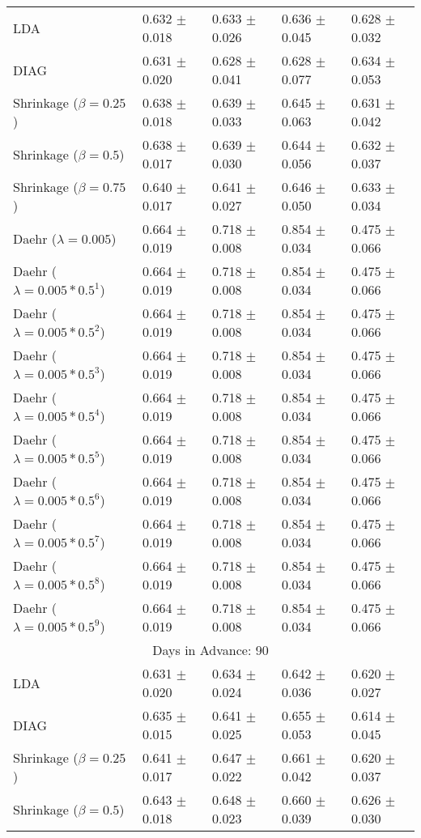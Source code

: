 \begin{table}
\begin{tabular}{*{5}{l}}
LDA&0.632 $\pm$ 0.018&0.633 $\pm$ 0.026&0.636 $\pm$ 0.045&0.628 $\pm$ 0.032\\
DIAG&0.631 $\pm$ 0.020&0.628 $\pm$ 0.041&0.628 $\pm$ 0.077&0.634 $\pm$ 0.053\\
Shrinkage ($\beta=0.25$)&0.638 $\pm$ 0.018&0.639 $\pm$ 0.033&0.645 $\pm$ 0.063&0.631 $\pm$ 0.042\\
Shrinkage ($\beta=0.5$)&0.638 $\pm$ 0.017&0.639 $\pm$ 0.030&0.644 $\pm$ 0.056&0.632 $\pm$ 0.037\\
Shrinkage ($\beta=0.75$)&0.640 $\pm$ 0.017&0.641 $\pm$ 0.027&0.646 $\pm$ 0.050&0.633 $\pm$ 0.034\\
Daehr ($\lambda=0.005$)&0.664 $\pm$ 0.019&0.718 $\pm$ 0.008&0.854 $\pm$ 0.034&0.475 $\pm$ 0.066\\
Daehr ($\lambda=0.005*0.5^1$)&0.664 $\pm$ 0.019&0.718 $\pm$ 0.008&0.854 $\pm$ 0.034&0.475 $\pm$ 0.066\\
Daehr ($\lambda=0.005*0.5^2$)&0.664 $\pm$ 0.019&0.718 $\pm$ 0.008&0.854 $\pm$ 0.034&0.475 $\pm$ 0.066\\
Daehr ($\lambda=0.005*0.5^3$)&0.664 $\pm$ 0.019&0.718 $\pm$ 0.008&0.854 $\pm$ 0.034&0.475 $\pm$ 0.066\\
Daehr ($\lambda=0.005*0.5^4$)&0.664 $\pm$ 0.019&0.718 $\pm$ 0.008&0.854 $\pm$ 0.034&0.475 $\pm$ 0.066\\
Daehr ($\lambda=0.005*0.5^5$)&0.664 $\pm$ 0.019&0.718 $\pm$ 0.008&0.854 $\pm$ 0.034&0.475 $\pm$ 0.066\\
Daehr ($\lambda=0.005*0.5^6$)&0.664 $\pm$ 0.019&0.718 $\pm$ 0.008&0.854 $\pm$ 0.034&0.475 $\pm$ 0.066\\
Daehr ($\lambda=0.005*0.5^7$)&0.664 $\pm$ 0.019&0.718 $\pm$ 0.008&0.854 $\pm$ 0.034&0.475 $\pm$ 0.066\\
Daehr ($\lambda=0.005*0.5^8$)&0.664 $\pm$ 0.019&0.718 $\pm$ 0.008&0.854 $\pm$ 0.034&0.475 $\pm$ 0.066\\
Daehr ($\lambda=0.005*0.5^9$)&0.664 $\pm$ 0.019&0.718 $\pm$ 0.008&0.854 $\pm$ 0.034&0.475 $\pm$ 0.066\\
\hline\multicolumn{5}{c}{  Days in Advance: 90}\\\hline
LDA&0.631 $\pm$ 0.020&0.634 $\pm$ 0.024&0.642 $\pm$ 0.036&0.620 $\pm$ 0.027\\
DIAG&0.635 $\pm$ 0.015&0.641 $\pm$ 0.025&0.655 $\pm$ 0.053&0.614 $\pm$ 0.045\\
Shrinkage ($\beta=0.25$)&0.641 $\pm$ 0.017&0.647 $\pm$ 0.022&0.661 $\pm$ 0.042&0.620 $\pm$ 0.037\\
Shrinkage ($\beta=0.5$)&0.643 $\pm$ 0.018&0.648 $\pm$ 0.023&0.660 $\pm$ 0.039&0.626 $\pm$ 0.030\\

\end{tabular}
\end{table}

